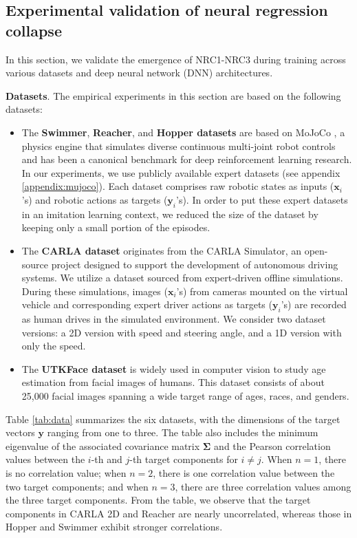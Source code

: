 \documentclass{article}
\theoremstyle{plain}
\theoremstyle{definition}
\theoremstyle{remark}
\newcommand{\by}{{\mathbf y}}
\newcommand{\bSigma}{{\mathbf \Sigma}}
\newcommand{\byi}{{\mathbf y}_i}
\newcommand{\bxi}{{\mathbf x}_i}
\begin{document}
\subsection{Experimental validation of neural regression collapse}
\label{sec:exp_case1}

In this section, we validate the emergence of NRC1-NRC3 during training across various datasets and deep neural network (DNN) architectures.

\textbf{Datasets}. The empirical experiments in this section are based on the following datasets:
\begin{itemize}
\item The {\bf Swimmer}, {\bf Reacher}, and {\bf Hopper datasets} are based on MoJoCo \citep{mujoco, brockman2016openai,towers_gymnasium_2023}, a physics engine that simulates diverse continuous multi-joint robot controls and has been a canonical benchmark for deep reinforcement learning research. In our experiments, we use publicly available expert datasets (see appendix \ref{appendix:mujoco}).
Each dataset comprises raw robotic states as inputs ($\bxi$'s) and robotic actions as targets ($\byi$'s). In order to put these expert datasets in an imitation learning context, we reduced the size of the dataset by keeping only a small portion of the episodes. 
\item The {\bf CARLA dataset} originates from the CARLA Simulator, an open-source project designed to support the development of autonomous driving systems. We utilize a dataset \cite{Codevilla2018} sourced from expert-driven offline simulations. During these simulations, images ($\bxi$'s) from cameras mounted on the virtual vehicle and corresponding expert driver actions as targets ($\byi$'s) are recorded as human drives in the simulated environment. We consider two dataset versions: a 2D version with speed and steering angle, and a 1D version with only the speed.
\item The {\bf UTKFace dataset} \citep{zhifei2017cvpr} is widely used in computer vision to study age estimation from facial images of humans. This dataset consists of about 25,000 facial images spanning a wide target range of ages, races, and genders.  
\end{itemize}

Table \ref{tab:data} summarizes the six datasets, with the dimensions of the target vectors $\by$ ranging from one to three. The table also includes the minimum eigenvalue of the associated covariance matrix $\bSigma$ and the Pearson correlation values between the $i$-th and $j$-th target components for $i \neq j$. When $n=1$, there is no correlation value; when $n=2$, there is one correlation value between the two target components; and when $n=3$, there are three correlation values among the three target components. From the table, we observe that the target components in CARLA 2D and Reacher are nearly uncorrelated, whereas those in Hopper and Swimmer exhibit stronger correlations.
\end{document}
